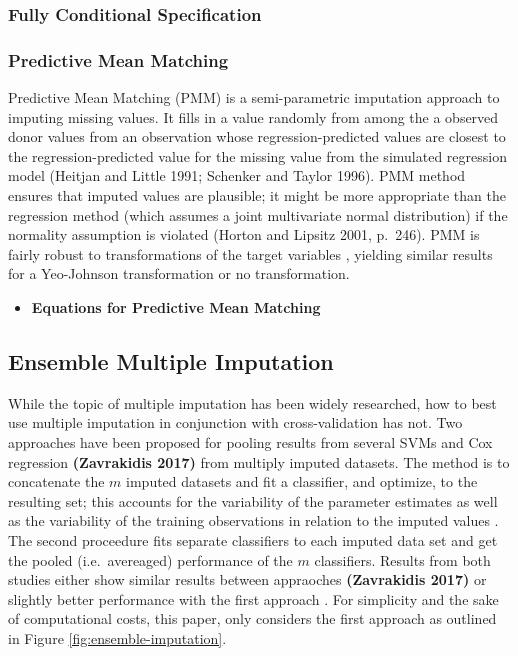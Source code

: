 \documentclass[12pt,]{article}
\providecommand{\tightlist}{%
  \setlength{\itemsep}{0pt}\setlength{\parskip}{0pt}}
\begin{document}
\subsubsection{Fully Conditional
Specification}\label{fully-conditional-specification}

\subsubsection{Predictive Mean Matching}\label{predictive-mean-matching}

Predictive Mean Matching (PMM) is a semi-parametric imputation approach
to imputing missing values. It fills in a value randomly from among the
a observed donor values from an observation whose regression-predicted
values are closest to the regression-predicted value for the missing
value from the simulated regression model (Heitjan and Little 1991;
Schenker and Taylor 1996). PMM method ensures that imputed values are
plausible; it might be more appropriate than the regression method
(which assumes a joint multivariate normal distribution) if the
normality assumption is violated (Horton and Lipsitz 2001, p.~246). PMM
is fairly robust to transformations of the target variables
\autocite{van_buuren_flexible_2012}, yielding similar results for a
Yeo-Johnson transformation or no transformation.

\begin{itemize}
\tightlist
\item
  \textbf{Equations for Predictive Mean Matching}
\end{itemize}

\subsection{Ensemble Multiple
Imputation}\label{ensemble-multiple-imputation}

While the topic of multiple imputation has been widely researched, how
to best use multiple imputation in conjunction with cross-validation has
not. Two approaches have been proposed for pooling results from several
SVMs \autocite{belanche_handling_2014} and Cox regression
\textbf{(Zavrakidis 2017)} from multiply imputed datasets. The method is
to concatenate the \(m\) imputed datasets and fit a classifier, and
optimize, to the resulting set; this accounts for the variability of the
parameter estimates as well as the variability of the training
observations in relation to the imputed values
\autocite*{belanche_handling_2014}. The second proceedure fits separate
classifiers to each imputed data set and get the pooled (i.e.~avereaged)
performance of the \(m\) classifiers. Results from both studies either
show similar results between appraoches \textbf{(Zavrakidis 2017)} or
slightly better performance with the first approach
\autocite*{belanche_handling_2014}. For simplicity and the sake of
computational costs, this paper, only considers the first approach as
outlined in Figure \ref{fig:ensemble-imputation}.
\end{document}
